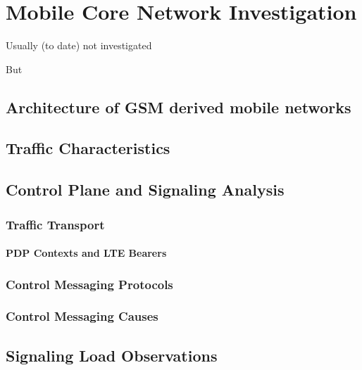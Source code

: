 \chapter{Mobile Core Network Investigation}

Usually (to date) not investigated

But 



\section{Architecture of GSM derived mobile networks}



\section{Traffic Characteristics}



\section{Control Plane and Signaling Analysis}
\subsection{Traffic Transport}
\subsubsection{PDP Contexts and LTE Bearers}
\subsection{Control Messaging Protocols}
\subsection{Control Messaging Causes}



\section{Signaling Load Observations}



